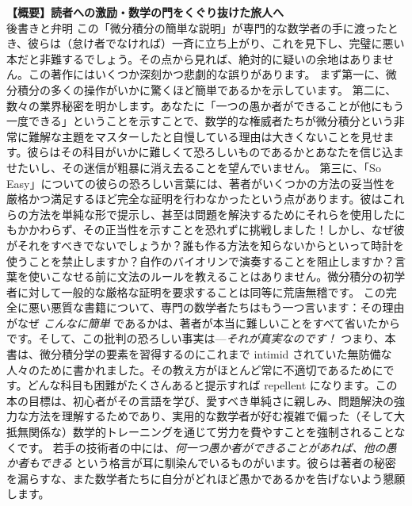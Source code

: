 \documentclass[a4paper,11pt,openany]{ltjsbook}
\begin{document}
\noindent\textbf{\large 【概要】読者への激励・数学の門をくぐり抜けた旅人へ}\\[4mm]
後書きと弁明
この「微分積分の簡単な説明」が専門的な数学者の手に渡ったとき、彼らは（怠け者でなければ）一斉に立ち上がり、これを見下し、完璧に悪い本だと非難するでしょう。その点から見れば、絶対的に疑いの余地はありません。この著作にはいくつか深刻かつ悲劇的な誤りがあります。
まず第一に、微分積分の多くの操作がいかに驚くほど簡単であるかを示しています。
第二に、数々の業界秘密を明かします。あなたに「一つの愚か者ができることが他にもう一度できる」ということを示すことで、数学的な権威者たちが微分積分という非常に難解な主題をマスターしたと自慢している理由は大きくないことを見せます。彼らはその科目がいかに難しくて恐ろしいものであるかとあなたを信じ込ませたいし、その迷信が粗暴に消え去ることを望んでいません。
第三に、「So Easy」についての彼らの恐ろしい言葉には、著者がいくつかの方法の妥当性を厳格かつ満足するほど完全な証明を行わなかったという点があります。彼はこれらの方法を単純な形で提示し、甚至は問題を解決するためにそれらを使用したにもかかわらず、その正当性を示すことを恐れずに挑戦しました！しかし、なぜ彼がそれをすべきでないでしょうか？誰も作る方法を知らないからといって時計を使うことを禁止しますか？自作のバイオリンで演奏することを阻止しますか？言葉を使いこなせる前に文法のルールを教えることはありません。微分積分の初学者に対して一般的な厳格な証明を要求することは同等に荒唐無稽です。
この完全に悪い悪質な書籍について、専門の数学者たちはもう一つ言います：その理由がなぜ \emph{こんなに簡単} であるかは、著者が本当に難しいことをすべて省いたからです。そして、この批判の恐ろしい事実は---\emph{それが真実なのです！} つまり、本書は、微分積分学の要素を習得するのにこれまで intimid されていた無防備な人々のために書かれました。その教え方がほとんど常に不適切であるためにです。どんな科目も困難がたくさんあると提示すれば repellent になります。この本の目標は、初心者がその言語を学び、愛すべき単純さに親しみ、問題解決の強力な方法を理解するためであり、実用的な数学者が好む複雑で偏った（そして大抵無関係な）数学的トレーニングを通じて労力を費やすことを強制されることなくです。
若手の技術者の中には、\emph{何一つ愚か者ができることがあれば、他の愚か者もできる} という格言が耳に馴染んでいるものがいます。彼らは著者の秘密を漏らすな、また数学者たちに自分がどれほど愚かであるかを告げないよう懇願します。
\end{document}

